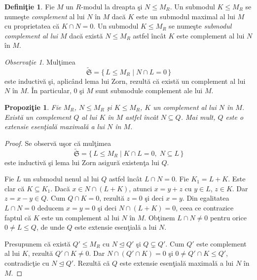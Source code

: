 \documentclass[12pt,a4paper]{book}
\newcommand{\ess}{\trianglelefteq}  %
\theoremstyle{plain}
\newtheorem{proposition}[theorem]{Propoziţie}
\theoremstyle{definition}
\newtheorem{definition}[theorem]{Definiţie}
\theoremstyle{remark}
\newtheorem{remark}[theorem]{Observaţie}
\begin{document}
\begin{definition}
Fie \(M\) un \(R\)-modul la dreapta şi \(N \leq M_R\).
Un submodul \(K \leq M_R\) se numeşte \emph{complement} al lui \(N\) în \(M\)
dacă \(K\) este un submodul maximal al lui \(M\) cu proprietatea că
\(K \cap N = 0\).
Un submodul \(K \leq M_R\) se numeşte \emph{submodul complement al lui \(M\)}
dacă există \(N \leq M_R\) astfel încât \(K\) este complement al lui \(N\) în \(M\).
\end{definition}

\begin{remark}
Mulţimea
\[
\widetilde{\mathfrak{S}}
  = \{\,L \leq M_R \mid N \cap L = 0\,\}
\]
este inductivă şi, aplicând lema lui Zorn, rezultă că există un complement al lui
\(N\) în \(M\).
În particular, \(0\) şi \(M\) sunt submodule complement ale lui \(M\).
\end{remark}

\begin{proposition}
Fie \(M_R\), \(N \leq M_R\) şi \(K \leq M_R\), \(K\) un complement al lui \(N\) în \(M\).
Există un complement \(Q\) al lui \(K\) în \(M\) astfel încât \(N \subseteq Q\).
Mai mult, \(Q\) este o extensie esenţială maximală a lui \(N\) în \(M\).
\end{proposition}

\begin{proof}
Se observă uşor că mulţimea
\[
\widetilde{\mathfrak{S}}
  = \{\,L \leq M_R \mid K \cap L = 0,\; N \subseteq L\,\}
\]
este inductivă şi lema lui Zorn asigură existenţa lui \(Q\).

Fie \(L\) un submodul nenul al lui \(Q\) astfel încât \(L \cap N = 0\).
Fie \(K_1 = L + K\).
Este clar că \(K \subseteq K_1\).
Dacă \(x \in N \cap (L + K)\), atunci \(x = y + z\) cu \(y \in L\), \(z \in K\).
Dar \(z = x - y \in Q\).
Cum \(Q \cap K = 0\), rezultă \(z = 0\) şi deci \(x = y\).
Din egalitatea \(L \cap N = 0\) deducem \(x = y = 0\) şi deci
\(N \cap (L + K) = 0\), ceea ce contrazice faptul că \(K\) este un complement
al lui \(N\) în \(M\).
Obţinem \(L \cap N \neq 0\) pentru orice \(0 \neq L \leq Q\), de unde
\(Q\) este extensie esenţială a lui \(N\).

Presupunem că există \(Q' \leq M_R\) cu \(N \ess Q'\) şi \(Q \subsetneq Q'\).
Cum \(Q'\) este complement al lui \(K\), rezultă \(Q' \cap K \neq 0\).
Dar \(N \cap (Q' \cap K) = 0\) şi
\(0 \neq Q' \cap K \leq Q'\), contradicţie cu \(N \ess Q'\).
Rezultă că \(Q\) este extensie esenţială maximală a lui \(N\) în \(M\).
\end{proof}
\end{document}
